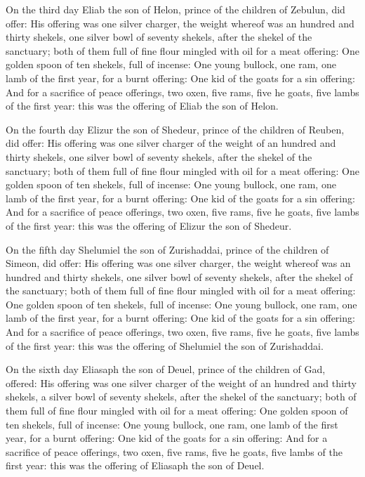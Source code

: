  On the third day Eliab the son of Helon, prince of the
children of Zebulun, did offer:  His offering was one
silver charger, the weight whereof was an hundred and thirty shekels,
one silver bowl of seventy shekels, after the shekel of the sanctuary;
both of them full of fine flour mingled with oil for a meat offering:
 One golden spoon of ten shekels, full of incense:
 One young bullock, one ram, one lamb of the first year,
for a burnt offering:  One kid of the goats for a sin
offering:  And for a sacrifice of peace offerings, two
oxen, five rams, five he goats, five lambs of the first year: this was
the offering of Eliab the son of Helon.

 On the fourth day Elizur the son of Shedeur, prince of
the children of Reuben, did offer:  His offering was one
silver charger of the weight of an hundred and thirty shekels, one
silver bowl of seventy shekels, after the shekel of the sanctuary; both
of them full of fine flour mingled with oil for a meat offering:
 One golden spoon of ten shekels, full of incense:
 One young bullock, one ram, one lamb of the first year,
for a burnt offering:  One kid of the goats for a sin
offering:  And for a sacrifice of peace offerings, two
oxen, five rams, five he goats, five lambs of the first year: this was
the offering of Elizur the son of Shedeur.

 On the fifth day Shelumiel the son of Zurishaddai,
prince of the children of Simeon, did offer:  His offering
was one silver charger, the weight whereof was an hundred and thirty
shekels, one silver bowl of seventy shekels, after the shekel of the
sanctuary; both of them full of fine flour mingled with oil for a meat
offering:  One golden spoon of ten shekels, full of
incense:  One young bullock, one ram, one lamb of the first
year, for a burnt offering:  One kid of the goats for a sin
offering:  And for a sacrifice of peace offerings, two
oxen, five rams, five he goats, five lambs of the first year: this was
the offering of Shelumiel the son of Zurishaddai.

 On the sixth day Eliasaph the son of Deuel, prince of
the children of Gad, offered:  His offering was one silver
charger of the weight of an hundred and thirty shekels, a silver bowl of
seventy shekels, after the shekel of the sanctuary; both of them full of
fine flour mingled with oil for a meat offering:  One
golden spoon of ten shekels, full of incense:  One young
bullock, one ram, one lamb of the first year, for a burnt offering:
 One kid of the goats for a sin offering:  And
for a sacrifice of peace offerings, two oxen, five rams, five he goats,
five lambs of the first year: this was the offering of Eliasaph the son
of Deuel.

